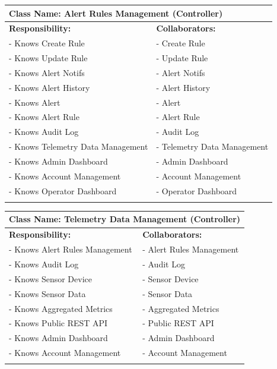 {	\begin{table}[ht]
		\centering
		\begin{tabular}{|p{8cm}|p{8cm}|}
		\hline 
		 \multicolumn{2}{|l|}{\textbf{Class Name:} Alert Rules Management (Controller)} \\
		\hline
		\textbf{Responsibility:} & \textbf{Collaborators:} \\
		\hline
		 - Knows Create Rule & - Create Rule \\
		 - Knows Update Rule & - Update Rule \\
		 - Knows Alert Notifs & - Alert Notifs \\
		 - Knows Alert History & - Alert History \\
		 - Knows Alert & - Alert \\
		 - Knows Alert Rule & - Alert Rule \\
		 - Knows Audit Log & - Audit Log \\
		 - Knows Telemetry Data Management & - Telemetry Data Management \\
		 - Knows Admin Dashboard & - Admin Dashboard \\
		 - Knows Account Management & - Account Management \\
		 - Knows Operator Dashboard & - Operator Dashboard \\
		\vspace{1in} & \\
		\hline
		\end{tabular}
	\end{table}

	\begin{table}[ht]
		\centering
		\begin{tabular}{|p{8cm}|p{8cm}|}
		\hline 
		 \multicolumn{2}{|l|}{\textbf{Class Name:} Telemetry Data Management (Controller)} \\
		\hline
		\textbf{Responsibility:} & \textbf{Collaborators:} \\
		\hline
		 - Knows Alert Rules Management & - Alert Rules Management \\
		 - Knows Audit Log & - Audit Log \\
		 - Knows Sensor Device & - Sensor Device \\
		 - Knows Sensor Data & - Sensor Data \\
		 - Knows Aggregated Metrics & - Aggregated Metrics \\
		 - Knows Public REST API & - Public REST API \\
		 - Knows Admin Dashboard & - Admin Dashboard \\
		 - Knows Account Management & - Account Management \\
		\vspace{1in} & \\
		\hline
		\end{tabular}
	\end{table}

}
